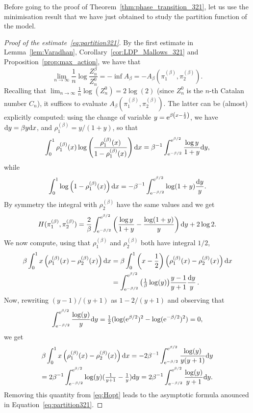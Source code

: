 \documentclass[a4paper,11pt]{amsart}
\newcommand{\dd}{\textup{d}}
\newcommand{\ee}{\textup{e}}
\theoremstyle{definition}
\begin{document}
Before going to the proof of Theorem~\ref{thm:phase_transition_321}, 
let us use the minimisation result that we have just obtained to study the partition function of the model.

\begin{proof}[Proof of the estimate~\eqref{eq:partition321}]
	By the first estimate in Lemma~\ref{lem:Varadhan}, Corollary~\ref{cor:LDP_Mallows_321} and Proposition~\ref{prop:max_action}, we have that
\[ \lim_{n \rightarrow \infty} \frac{1}{n} \log \frac{Z_n^\beta}{Z_n^0} =- \inf A_\beta =  -A_\beta(\pi_1^{(\beta)}, \pi_2^{(\beta)}).\]
	Recalling that $\lim_{n \rightarrow \infty} \frac{1}{n} \log (Z_n^0)=2 \log(2)$ (since $Z_n^0$ is the $n$-th Catalan number $C_n$),
	it suffices to evaluate $A_\beta(\pi_1^{(\beta)}, \pi_2^{(\beta)})$.
The latter can be (almost) explicitly computed: using the change of variable
$y = \ee^{\beta\left(x-\frac{1}{2}\right)}$, we have $\dd y=\beta y \dd x$, and $\rho^{(\beta)}_1=y/(1+y)$, so that
	\[ \int_0^1 \rho^{(\beta)}_1(x) \log\left( \frac{\rho^{(\beta)}_1(x)}{1-\rho^{(\beta)}_1(x)} \right) \mathrm{d}x =\beta^{-1} \int_{\ee^{-\beta/2}}^{\ee^{\beta/2}}  \frac{\log y }{1+y} \dd y,\]
	while
	\[ \int_0^1 \log\left( {1-\rho^{(\beta)}_1(x)} \right) \mathrm{d}x = - \beta^{-1} \int_{\ee^{-\beta/2}}^{\ee^{\beta/2}} \log(1+y) \frac{\dd y}{y}.\]
	By symmetry the integral with $\rho^{(\beta)}_2$ have the same values and we get
	\begin{equation}\label{eq:Hopt} H(\pi_1^{(\beta)}, \pi_2^{(\beta)}) = \frac{2}{\beta} \int_{\ee^{-\beta/2}}^{\ee^{\beta/2}} \left( \frac{\log y }{1+y} -  \frac{\log (1+y) }{y}\right) \dd y + 2 \log 2.
	\end{equation}
	We now compute, using that $\rho_1^{(\beta)}$ and $\rho_2^{(\beta)}$ both have integral $1/2$,
	\begin{align*}
    \beta \int_0^1 x\left(\rho_1^{(\beta)}(x) - \rho_2^{(\beta)}(x)\right) \dd x 
    &= \beta \int_0^1 \left( x-\frac{1}{2} \right) \left(\rho_1^{(\beta)}(x) - \rho_2^{(\beta)}(x)\right) \dd x 
	\\&= \int_{\ee^{-\beta/2}}^{\ee^{\beta/2}}
	\big( \tfrac1{\beta}\log(y) \big) \frac{y-1}{y+1} \frac{\dd y}{y} \,.
    \end{align*}
	Now, rewriting $(y-1)/(y+1)$ as $1-2/(y+1)$ and observing that
	\[\int_{\ee^{-\beta/2}}^{\ee^{\beta/2}} \frac{\log(y)}{y} \dd y =\tfrac12 (\log(\ee^{\beta/2})^2 - \log(\ee^{-\beta/2})^2) =0,\]
	we get
	\begin{multline*}
	\beta \int_0^1 x\left(\rho_1^{(\beta)}(x) - \rho_2^{(\beta)}(x)\right) \dd x =
	-2 \beta^{-1} \int_{\ee^{-\beta/2}}^{\ee^{\beta/2}} \frac{\log(y)}{y(y+1)} \dd y\\
	=
	2 \beta^{-1} \int_{\ee^{-\beta/2}}^{\ee^{\beta/2}} \log(y) (\tfrac1{y+1}-\tfrac1y) \dd y=
	2 \beta^{-1} \int_{\ee^{-\beta/2}}^{\ee^{\beta/2}} \frac{\log(y)}{y+1} \dd y.
	\end{multline*}
	Removing this quantity
	from \eqref{eq:Hopt} leads to the asymptotic formula anounced in Equation~\eqref{eq:partition321}.
\end{proof}
\end{document}
